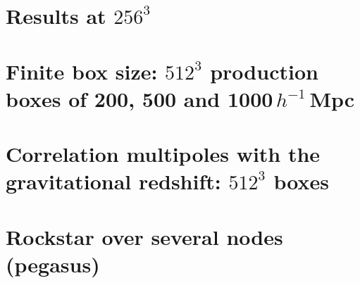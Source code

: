 \documentclass[11pt,a4paper]{article}
\newcommand{\Mpch}{$h^{-1}$\,Mpc}
\begin{document}
\section{Results at $256^3$}
\label{sec:r256}



\section{Finite box size: $512^3$ production boxes of 200, 500 and 1000\,\Mpch}
\label{sec:boxsize}



\section{Correlation multipoles with the gravitational redshift: $512^3$ boxes}
\label{sec:ximult512}



\section{Rockstar over several nodes (pegasus)}
\label{sec:rsmultinode}



\end{document}
